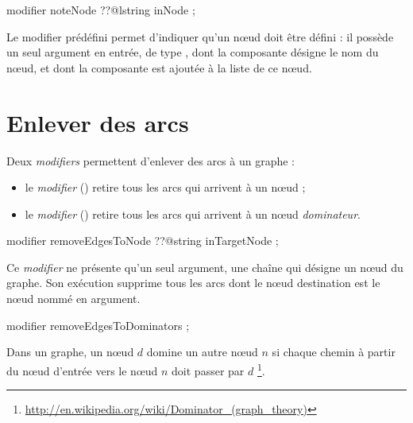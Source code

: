 
\begin{galgascode}
modifier noteNode ??@lstring inNode ;
\end{galgascode}

Le modifier prédéfini  permet d'indiquer qu'un nœud doit être défini : il possède un seul argument en entrée, de type , dont la composante  désigne le nom du nœud, et dont la composante  est ajoutée à la liste de ce nœud.



\section{Enlever des arcs}

Deux \emph{modifiers} permettent d'enlever des arcs à un graphe :
\begin{itemize}
  \item le \emph{modifier}  () retire tous les arcs qui arrivent à un nœud ;
  \item le \emph{modifier}  () retire tous les arcs qui arrivent à un nœud \emph{dominateur}.
\end{itemize}




\begin{galgascode}
modifier removeEdgesToNode ??@string inTargetNode ;
\end{galgascode}

Ce \emph{modifier} ne présente qu'un seul argument, une chaîne qui désigne un nœud du graphe. Son exécution supprime tous les arcs dont le nœud destination est le nœud nommé en argument.


\begin{galgascode}
modifier removeEdgesToDominators ;
\end{galgascode}

Dans un graphe, un nœud $d$ domine un autre nœud $n$ si chaque chemin à partir du nœud d'entrée vers le nœud $n$ doit passer par $d$ \footnote{\url{http://en.wikipedia.org/wiki/Dominator_(graph_theory)}}.

